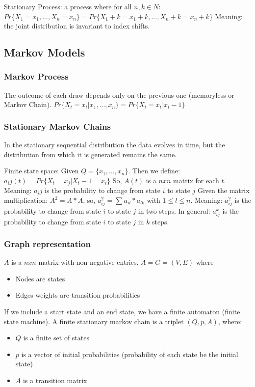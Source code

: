 \documentclass[main]{subfiles}
\begin{document}
Stationary Process: a process where
for all $n,k \in N$: $Pr\{X_1 = x_1, . . . , X_n = x_n\} = Pr\{X_1+k = x_1+k, . . . , X_n+k = x_n+k \}$
Meaning: the joint distribution is invariant to index shifts.

\subsection{Markov Models}
\subsubsection{Markov Process}
The outcome of each draw depends only on the previous one (memoryless or Markov Chain).
$Pr\{X_t = x_t| x_1, . . . , x_n\} = Pr\{X_t = x_t | x_t-1\}$

\subsubsection{Stationary Markov Chains}
In the stationary sequential distribution the data evolves in time, but the distribution from
which it is generated remains the same.

Finite state space: Given $Q = \{x_1, . . . , x_n\}$. Then we define:
$a_ij(t) = Pr\{X_t = x_j | X_t-1 = x_i\}$
So, $A(t)$ is a $n x n$ matrix for each $t$.
Meaning: $a_ij$ is the probability to change from state $i$ to state $j$
Given the matrix multiplication: $A^2 = A * A$, so, $a_{ij}^2 = \sum a_{il} * a_{lk} $ with $1 \leq l \leq n$.
Meaning: $a_{ij}^2$ is the probability to change from state $i$ to state $j$ in two steps. In general:
$a_{ij}^k$ is the probability to change from state $i$ to state $j$ in $k$ steps.

\subsubsection{Graph representation}
$A$ is a $n x n$ matrix with non-negative entries.
$A = G = (V,E)$ where
\begin{itemize}
\item Nodes are states
\item Edges weights are transition probabilities
\end{itemize}
If we include a start state and an end state, we have a finite automaton (finite state machine).
A finite stationary markov chain is a triplet $(Q, p, A)$, where:
\begin{itemize}
\item $Q$ is a finite set of states
\item $p$ is a vector of initial probabilities (probability of each state be the initial state)
\item $A$ is a transition matrix
\end{itemize}
\end{document}
